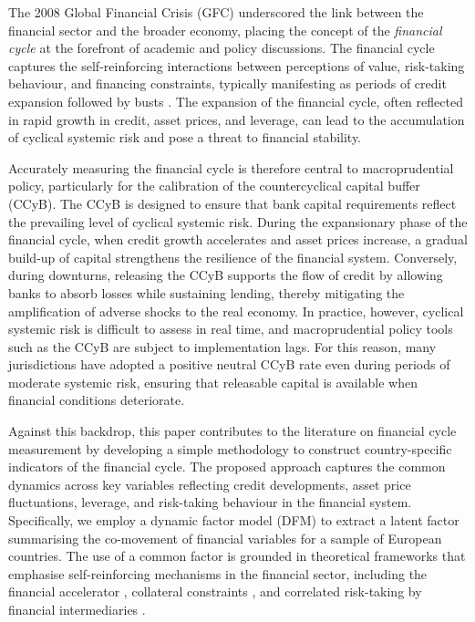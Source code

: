 The 2008 Global Financial Crisis (GFC) underscored the link between the financial sector and the broader economy, placing the concept of the \textit{financial cycle} at the forefront of academic and policy discussions. The financial cycle captures the self-reinforcing interactions between perceptions of value, risk-taking behaviour, and financing constraints, typically manifesting as periods of credit expansion followed by busts \citep{borio2014financial}. The expansion of the financial cycle, often reflected in rapid growth in credit, asset prices, and leverage, can lead to the accumulation of cyclical systemic risk and pose a threat to financial stability.

Accurately measuring the financial cycle is therefore central to macroprudential policy, particularly for the calibration of the countercyclical capital buffer (CCyB). The CCyB is designed to ensure that bank capital requirements reflect the prevailing level of cyclical systemic risk. During the expansionary phase of the financial cycle, when credit growth accelerates and asset prices increase, a gradual build-up of capital strengthens the resilience of the financial system. Conversely, during downturns, releasing the CCyB supports the flow of credit by allowing banks to absorb losses while sustaining lending, thereby mitigating the amplification of adverse shocks to the real economy. In practice, however, cyclical systemic risk is difficult to assess in real time, and macroprudential policy tools such as the CCyB are subject to implementation lags. For this reason, many jurisdictions have adopted a positive neutral CCyB rate even during periods of moderate systemic risk, ensuring that releasable capital is available when financial conditions deteriorate.

Against this backdrop, this paper contributes to the literature on financial cycle measurement by developing a simple methodology to construct country-specific indicators of the financial cycle. The proposed approach captures the common dynamics across key variables reflecting credit developments, asset price fluctuations, leverage, and risk-taking behaviour in the financial system. Specifically, we employ a dynamic factor model (DFM) to extract a latent factor summarising the co-movement of financial variables for a sample of European countries. The use of a common factor is grounded in theoretical frameworks that emphasise self-reinforcing mechanisms in the financial sector, including the financial accelerator \citep{bernanke1999financial}, collateral constraints \citep{kiyotaki1997credit}, and correlated risk-taking by financial intermediaries \citep{he2013intermediary}.


